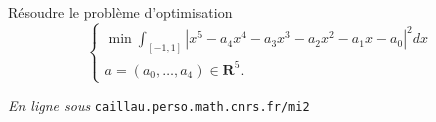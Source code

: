 \documentclass[11pt,a4paper]{article}
\def\R{\mathbf{R}}
\begin{document}
\enlargethispage{1cm}
\begin{Exercice} R\'esoudre le probl\`eme d'optimisation
$$ \left\{ \begin{array}{l}
  \min \int_{[-1,1]} |x^5-a_4 x^4-a_3 x^3-a_2 x^2-a_1 x-a_0|^2 dx\\
  a=(a_0,\dots,a_4) \in \R^5.
\end{array} \right. $$
\end{Exercice} \vspace*{1em}

\vfill \begin{flushright}{\footnotesize \emph{En ligne sous}
\texttt{caillau.perso.math.cnrs.fr/mi2}} \end{flushright}
\end{document}
